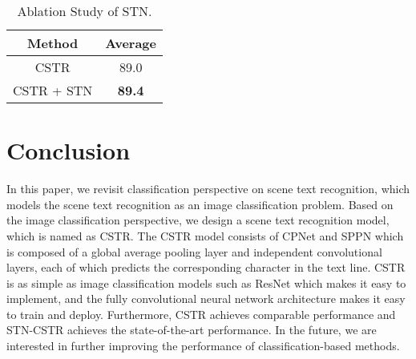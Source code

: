 \documentclass[final]{cvpr}
\begin{document}
\begin{table}[ht]
    \caption{Ablation Study of STN.}
    \label{table.stn}
	\centering
	\begin{tabular}{ | c | c |}
		\hline
		 	Method & Average \\ 
		\hline
		CSTR & 89.0\\
		\hline
		CSTR + STN & \textbf{89.4}\\
		\hline
	\end{tabular}
\end{table}

\section{Conclusion}
In this paper, we revisit classification perspective on scene text recognition, which models the scene text recognition as an image classification problem. Based on the image classification perspective, we design a scene text recognition model, which is named as CSTR.
The CSTR model consists of 
CPNet and SPPN which is composed of a global average pooling layer and independent convolutional layers, each of which predicts the corresponding character in the text line.
CSTR is as simple as image classification models such as ResNet \cite{he2016deep} which makes it easy to implement, and the fully convolutional neural network architecture makes it easy to train and deploy. 
Furthermore, CSTR achieves comparable performance and STN-CSTR achieves the state-of-the-art performance.
In the future, we are interested in further improving the performance of classification-based methods.


{\small


}
\end{document}
